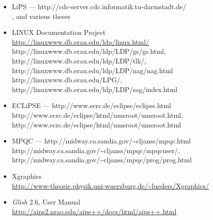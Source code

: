 \begin{description}
\begin{itemize}
\item
LiPS --- 
{http://cdc-server.cdc.informatik.tu-darmstadt.de/}\\
,
and various theses
\html{\smallskip}%

\item
LINUX Documentation Project\\
\url{http://linuxwww.db.erau.edu/ldp/linux.html/}\\
%
{http://linuxwww.db.erau.edu/ldp/LDP/gs/gs.html},
%
{http://linuxwww.db.erau.edu/ldp/LDP/tlk/},
%
{http://linuxwww.db.erau.edu/ldp/LDP/nag/nag.html}\\
%
{http://linuxwww.db.erau.edu/LPG/},
%
{http://linuxwww.db.erau.edu/ldp/LDP/sag/index.html}
\html{\smallskip}%

\item
ECLiPSE --- %
{http://www.ecrc.de/eclipse/eclipse.html}\\
%
{http://www.ecrc.de/eclipse/html/umsroot/umsroot.html},
%
{http://www.ecrc.de/eclipse/html/umsroot/umsroot.html}
\html{\smallskip}%

\item
MPQC --- 
{http://midway.ca.sandia.gov/\~{}cljanss/mpqc.html}\\
%
{http://midway.ca.sandia.gov/\~{}cljanss/mpqc/mpqcuser/},
%
{http://midway.ca.sandia.gov/\~{}cljanss/mpqc/prog/prog.html}
\html{\smallskip}%

\item
Xgraphics\\
\url{http://www-theorie.physik.uni-wuerzburg.de/~lueders/Xgraphics/}
\html{\smallskip}%

\item
\textit{Glish} 2.6, User Manual\\
\url{http://aips2.nrao.edu/aips++/docs/html/aips++.html}
\html{\smallskip}%


\end{itemize}
\end{description}
